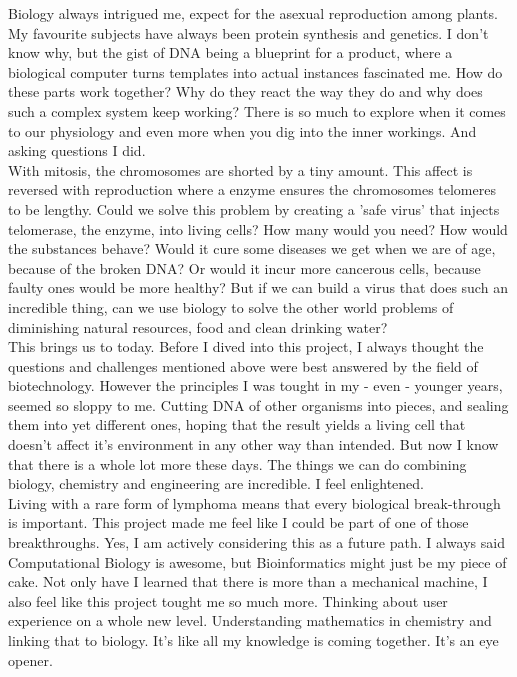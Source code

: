 Biology always intrigued me, expect for the asexual reproduction among plants. My favourite subjects have always been protein synthesis and genetics. I don't know why, but the gist of DNA being a blueprint for a product, where a biological computer turns templates into actual instances fascinated me. How do these parts work together? Why do they react the way they do and why does such a complex system keep working? There is so much to explore when it comes to our physiology and even more when you dig into the inner workings. And asking questions I did.\\

With mitosis, the chromosomes are shorted by a tiny amount. This affect is reversed with reproduction where a enzyme ensures the chromosomes telomeres to be lengthy. Could we solve this problem by creating a 'safe virus' that injects telomerase, the enzyme, into living cells? How many would you need? How would the substances behave? Would it cure some diseases we get when we are of age, because of the broken DNA? Or would it incur more cancerous cells, because faulty ones would be more healthy? But if we can build a virus that does such an incredible thing, can we use biology to solve the other world problems of diminishing natural resources, food and clean drinking water? \\

This brings us to today. Before I dived into this project, I always thought the questions and challenges mentioned above were best answered by the field of biotechnology. However the principles I was tought in my - even - younger years, seemed so sloppy to me. Cutting DNA of other organisms into pieces, and sealing them into yet different ones, hoping that the result yields a living cell that doesn't affect it's environment in any other way than intended. But now I know that there is a whole lot more these days. The things we can do combining biology, chemistry and engineering are incredible. I feel enlightened. \\

Living with a rare form of lymphoma means that every biological break-through is important. This project made me feel like I could be part of one of those breakthroughs. Yes, I am actively considering this as a future path. I always said Computational Biology is awesome, but Bioinformatics might just be my piece of cake. Not only have I learned that there is more than a mechanical machine, I also feel like this project tought me so much more. Thinking about user experience on a whole new level. Understanding mathematics in chemistry and linking that to biology. It's like all my knowledge is coming together. It's an eye opener.\\


